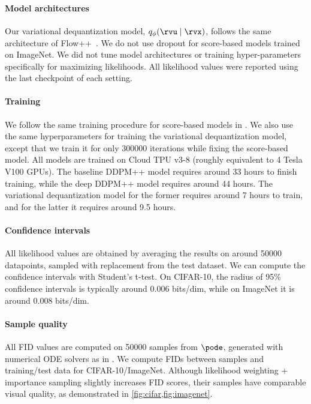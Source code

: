 \paragraph{Model architectures}
Our variational dequantization model, $q_\phi(\rvu \mid \rvx)$, follows the same architecture of Flow++~\cite{ho2019flow++}. We do not use dropout for score-based models trained on ImageNet. We did not tune model architectures or training hyper-parameters specifically for maximizing likelihoods. All likelihood values were reported using the last checkpoint of each setting.

\paragraph{Training} We follow the same training procedure for score-based models in \cite{song2020score}. We also use the same hyperparameters for training the variational dequantization model, except that we train it for only 300000 iterations while fixing the score-based model. All models are trained on Cloud TPU v3-8 (roughly equivalent to 4 Tesla V100 GPUs). The baseline DDPM++ model requires around 33 hours to finish training, while the deep DDPM++ model requires around 44 hours. The variational dequantization model for the former requires around 7 hours to train, and for the latter it requires around 9.5 hours.



\paragraph{Confidence intervals}
All likelihood values are obtained by averaging the results on around 50000 datapoints, sampled with replacement from the test dataset. We can compute the confidence intervals with Student's t-test. On CIFAR-10, the radius of 95\% confidence intervals is typically around 0.006 bits/dim, while on ImageNet it is around 0.008 bits/dim. 

\paragraph{Sample quality}
All FID values are computed on 50000 samples from $\pode$, generated with numerical ODE solvers as in \cite{song2020score}. We compute FIDs between samples and training/test data for CIFAR-10/ImageNet. Although likelihood weighting + importance sampling slightly increases FID scores, their samples have comparable visual quality, as demonstrated in \cref{fig:cifar,fig:imagenet}.

